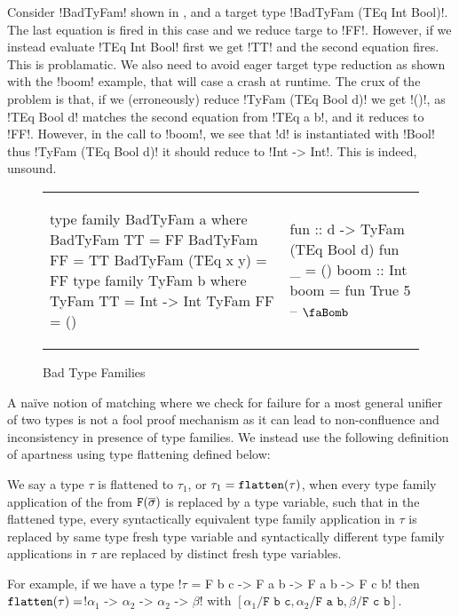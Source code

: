\documentclass[format=sigplan,manuscript,review,screen,nonacm,margin=1in]{acmart}
\begin{document}
Consider !BadTyFam! shown in , and a target type
!BadTyFam (TEq Int Bool)!. The last equation is fired in this case and we reduce targe to !FF!.
However, if we instead evaluate !TEq Int Bool! first we get !TT! and the second equation fires.
This is problamatic. We also need to avoid eager target type reduction as shown with the !boom! example,
that will case a crash at runtime. The crux of the problem is that, if we (erroneously) reduce
!TyFam (TEq Bool d)! we get !()!, as !TEq Bool d! matches the second equation from !TEq a b!,
and it reduces to !FF!. However, in the call to !boom!, we see that !d! is instantiated with !Bool!
thus !TyFam (TEq Bool d)! it should reduce to !Int -> Int!. This is indeed, unsound.
\begin{figure}[ht]
  \begin{tabular}{l l}
\begin{code}
type family BadTyFam a where
  BadTyFam TT        = FF
  BadTyFam FF        = TT
  BadTyFam (TEq x y) = FF
type family TyFam b where
  TyFam TT = Int -> Int
  TyFam FF = ()
\end{code}&%
\begin{code}
fun :: d -> TyFam (TEq Bool d)
fun _ = ()
boom :: Int
boom = fun True 5 -- $\text{\faBomb}$
\end{code}
  \end{tabular}
  \caption{Bad Type Families}
  \label{fig:closed-tf-bad}
\end{figure}
A na\"ive notion of matching where we check for failure for a most general unifier of two types
is not a fool proof mechanism as it can lead to non-confluence and inconsistency in presence of type families.
We instead use the following definition of apartness using type flattening defined below:
\begin{definition}\label{def:ctf-flatten}
  We say a type $\tau$ is flattened to $\tau_1$, or $\tau_1 = \texttt{flatten}(\tau)$, when every
  type family application of the from $\texttt{F}(\overline{\sigma})$ is replaced by a type variable,
  such that in the flattened type, every syntactically equivalent type family application
  in $\tau$ is replaced by same type fresh type variable and syntactically different type family applications in $\tau$
  are replaced by distinct fresh type variables.

  For example, if we have a type !$\tau$ = F b c -> F a b -> F a b -> F c b!
  then $\texttt{flatten}(\tau) =$!$\alpha_1$ -> $\alpha_2$ -> $\alpha_2$ -> $\beta$!
  with $[\alpha_1/\texttt{F b c}, \alpha_2/\texttt{F a b}, \beta/\texttt{F c b}]$.
\end{definition}
\end{document}
